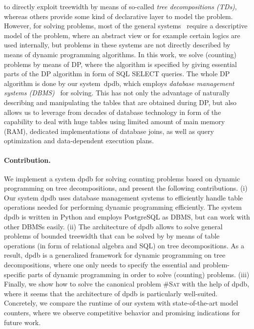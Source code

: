 \documentclass{llncs}
\newcommand{\cSAT}{\textsc{\#Sat}\xspace}%
\newcommand{\dpdb}{{\small\textsf{dpdb}}\xspace}
\begin{document}
to directly exploit treewidth
by means of so-called \emph{tree decompositions (TDs)},
whereas others provide some kind of declarative layer to model
the problem.
%
However, for solving problems, most of the general systems~\cite{BannachBerndt19,LangerEtAl12}
require a descriptive model of the problem, 
where an abstract view or for example certain logics are used internally,
but problems in these systems are not directly described by means of 
dynamic programming algorithms.
%
In this work, we solve (counting) problems by means of DP,
where the algorithm is specified by giving essential parts of the 
DP algorithm in form of SQL {\ttfamily SELECT} queries.
The whole DP algorithm is done by our system~\dpdb,
which employs \emph{database management systems (DBMS)}~\cite{Ullman89} for solving.
%
This has not only the advantage of naturally describing and manipulating the tables
that are obtained during DP, but also allows us to leverage from decades of
database technology in form of the capability to deal with huge tables
using limited amount of main memory (RAM),
dedicated implementations of database joins, as well as
query optimization and data-dependent execution plans.

%
%
%
%
\paragraph{Contribution.}  
We implement a system \dpdb for solving counting problems based on dynamic programming on tree decompositions,
and present the following contributions.
(i) Our system \dpdb uses database management systems to efficiently handle table operations needed
for performing dynamic programming efficiently. The system \dpdb is written in Python and employs PostgreSQL as DBMS,
but can work with other DBMSs easily.
(ii) The architecture of \dpdb allows to solve general problems of bounded treewidth that can be solved by
by means of table operations (in form of relational algebra and SQL) on tree decompositions. As a result, \dpdb is a generalized framework 
for dynamic programming on tree decompositions, where one only needs to specify the essential and problem-specific parts of dynamic programming
in order to solve (counting) problems.
(iii) Finally, we show how to solve the canonical problem \cSAT with the help of \dpdb, 
where it seems that the architecture of \dpdb
is particularly well-suited. Concretely, we compare the runtime of
our system with state-of-the-art model counters, where we observe competitive behavior
and promising indications for future work.
%
\end{document}
